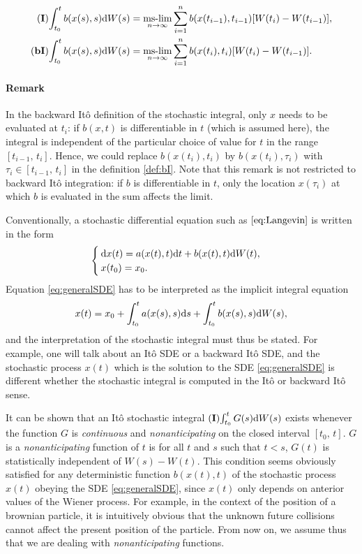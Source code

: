 \begin{subequations}
\begin{align}
        \I\int_{t_0}^t b(x(s),s) \rm dW(s) &= \mslim_{n\rightarrow \infty} \sum_{i=1}^n b(x(t_{i-1}),t_{i-1}) [W(t_i)-W(t_{i-1})], \label{def:I}\\
        \bI\int_{t_0}^t b(x(s),s) \rm dW(s) &= \mslim_{n\rightarrow \infty} \sum_{i=1}^n b(x(t_{i}),t_{i}) [W(t_i)-W(t_{i-1})]. \label{def:bI}
\end{align}
\end{subequations}
\paragraph{Remark}\label{remark:backwardIto} In the backward Itô definition of the stochastic integral, only $x$ needs to be evaluated at $t_i$: if $b(x,t)$ is differentiable in $t$ (which is assumed here), the integral is independent of the particular choice of value for $t$ in the range $[t_{i-1},\, t_i]$. Hence, we could replace $b(x(t_i),t_i)$ by $b(x(t_i),\tau_i)$ with $\tau_i \in [t_{i-1},\, t_i]$ in the definition \eqref{def:bI}. Note that this remark is not restricted to backward Itô integration: if $b$ is differentiable in $t$, only the location $x(\tau_i)$ at which $b$ is evaluated in the sum affects the limit.

Conventionally, a stochastic differential equation such as $\eqref{eq:Langevin}$ is written in the form
\begin{equation} \label{eq:generalSDE}
	\begin{cases}
		\rm dx(t) = a(x(t),t) \rm dt + b(x(t),t) \rm dW(t),\\
		x(t_0) = x_0. 
	\end{cases}
\end{equation}
Equation \eqref{eq:generalSDE} has to be interpreted as the implicit integral equation
\begin{equation}
	x(t) = x_0 + \int_{t_0}^t a(x(s),s) \rm ds + \int_{t_0}^t b(x(s),s) \rm dW(s),
\end{equation}
and the interpretation of the stochastic integral must thus be stated. For example, one will talk about an Itô SDE or a backward Itô SDE, and the stochastic process $x(t)$ which is the solution to the SDE \eqref{eq:generalSDE} is different whether the stochastic integral is computed in the Itô or backward Itô sense.

It can be shown that an Itô stochastic integral $\I\int_{t_0}^t G(s) \rm dW(s)$ exists whenever the function $G$ is \textit{continuous} and \textit{nonanticipating} on the closed interval $[t_0,\,t]$. $G$ is a \textit{nonanticipating} function of $t$ is for all $t$ and $s$ such that $t<s$, $G(t)$ is statistically independent of $W(s)-W(t)$. This condition seems obviously satisfied for any deterministic function $b(x(t),t)$ of the stochastic process $x(t)$ obeying the SDE \eqref{eq:generalSDE}, since $x(t)$ only depends on anterior values of the Wiener process. For example, in the context of the position of a brownian particle, it is intuitively obvious that the unknown future collisions cannot affect the present position of the particle. From now on, we assume thus that we are dealing with \textit{nonanticipating} functions.

